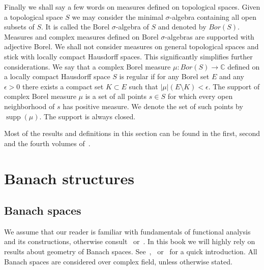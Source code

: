 Finally we shall say a few words on measures defined on topological spaces.
Given a topological space $S$ we may consider the minimal $\sigma$-algebra
containing all open subsets of $S$. It is called the Borel $\sigma$-algebra of
$S$ and denoted by $Bor(S)$. Measures and complex measures defined on Borel
$\sigma$-algebras are supported with adjective Borel. We shall not consider
measures on general topological spaces and stick with locally compact Hausdorff
spaces. This significantly simplifies further considerations. We say that a
complex Borel measure $\mu:Bor(S)\to\mathbb{C}$ defined on a locally compact
Hausdorff space $S$ is regular if for any Borel set $E$ and any $\epsilon>0$
there exists a compact set $K\subset E$ such that $|\mu|(E\setminus
K)<\epsilon$. The support of complex Borel measure $\mu$ is a set of all points
$s\in S$ for which every open neighborhood of $s$ has positive measure. We
denote the set of such points by $\operatorname{supp}(\mu)$. The support is
always closed. 

Most of the results and definitions in this section can be found in the first,
second and the fourth volumes of~\cite{FremMeasTh}.


\section{Banach structures}\label{SectionBanachStructures}


\subsection{Banach spaces}\label{SubSectionBanachSpaces}

We assume that our reader is familiar with fundamentals of functional analysis
and its constructions, otherwise consult~\cite{HelLectAndExOnFuncAn}
or~\cite{ConwACoursInFuncAn}. In this book we will highly rely on results about
geometry of Banach spaces.
See~\cite{CarothShortCourseBanSp},~\cite{KalAlbTopicsBanSpTh}
or~\cite{FabHabBanSpTh} for a quick introduction. All Banach spaces are
considered over complex field, unless otherwise stated. 

